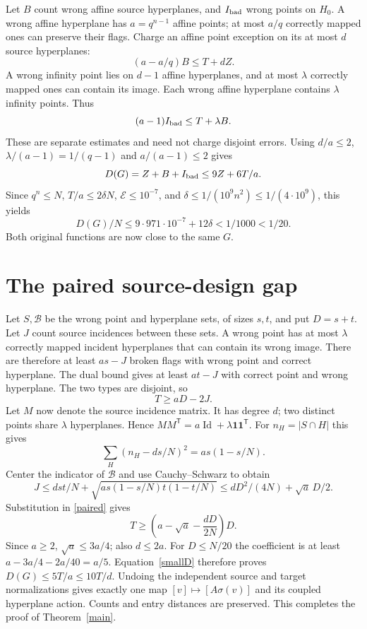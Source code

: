 \documentclass[11pt]{article}
\begin{document}
Let $B$ count wrong affine source hyperplanes, and $I_{\rm bad}$ wrong
points on $H_0$. A wrong affine hyperplane has $a=q^{n-1}$ affine
points; at most $a/q$ correctly mapped ones can preserve their flags.
Charge an affine point exception on its at most $d$ source hyperplanes:
\begin{equation}\label{wronghyperplanes}
 (a-a/q)B\leq T+dZ.
\end{equation}
A wrong infinity point lies on $d-1$ affine hyperplanes, and at most
$\lambda$ correctly mapped ones can contain its image. Each wrong
affine hyperplane contains $\lambda$ infinity points. Thus
\begin{equation}\label{wronginfinity}
 (a-1)I_{\rm bad}\leq T+\lambda B.
\end{equation}
These are separate estimates and need not charge disjoint errors.
Using $d/a\leq2$, $\lambda/(a-1)=1/(q-1)$ and $a/(a-1)\leq2$ gives
\begin{equation}\label{coarse}
 D(G)=Z+B+I_{\rm bad}\leq9Z+6T/a.
\end{equation}
Since $q^n\leq N$, $T/a\leq2\delta N$, $\mathcal E\leq10^{-7}$,
and $\delta\leq1/(10^9n^2)\leq1/(4\cdot10^9)$, this yields
\begin{equation}\label{smallD}
 D(G)/N\leq9\cdot971\cdot10^{-7}+12\delta<1/1000<1/20.
\end{equation}
Both original functions are now close to the same $G$.

\section{The paired source-design gap}\label{gap}
Let $S,\mathcal B$ be the wrong point and hyperplane sets, of sizes
$s,t$, and put $D=s+t$. Let $J$ count source incidences between these
sets. A wrong point has at most $\lambda$ correctly mapped incident
hyperplanes that can contain its wrong image. There are therefore at
least $as-J$ broken flags with wrong point and correct hyperplane.
The dual bound gives at least $at-J$ with correct point and wrong
hyperplane. The two types are disjoint, so
\begin{equation}\label{paired}
 T\geq aD-2J.
\end{equation}
Let $M$ now denote the source incidence matrix. It has degree $d$;
two distinct points share $\lambda$ hyperplanes. Hence
$MM^{\mathsf T}=a\operatorname{Id}+\lambda\mathbf1\mathbf1^{\mathsf T}$.
For $n_H=|S\cap H|$ this gives
\[
 \sum_H(n_H-ds/N)^2=as(1-s/N).
\]
Center the indicator of $\mathcal B$ and use Cauchy--Schwarz to obtain
\[
 J\leq dst/N+\sqrt{as(1-s/N)t(1-t/N)}
   \leq dD^2/(4N)+\sqrt a\,D/2.
\]
Substitution in \eqref{paired} gives
\[
 T\geq\left(a-\sqrt a-\frac{dD}{2N}\right)D.
\]
Since $a\geq2$, $\sqrt a\leq3a/4$; also $d\leq2a$.
For $D\leq N/20$ the coefficient is at least
$a-3a/4-2a/40=a/5$. Equation~\eqref{smallD} therefore proves
$D(G)\leq5T/a\leq10T/d$. Undoing the independent source and target
normalizations gives exactly one map $[v]\mapsto[A\sigma(v)]$ and its
coupled hyperplane action. Counts and entry distances are preserved.
This completes the proof of Theorem~\ref{main}.
\end{document}
